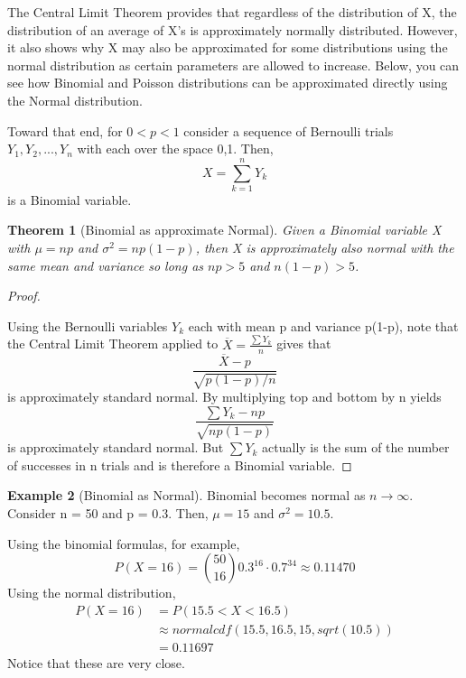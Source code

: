 \documentclass[10pt,]{book}
\theoremstyle{plain}
\newtheorem{theorem}{Theorem}[section]
\theoremstyle{definition}
\theoremstyle{definition}
\newtheorem{example}[theorem]{Example}
\theoremstyle{definition}
\numberwithin{equation}{section}
\newcommand{\lt}{ < }
\newcommand{\gt}{ > }
\begin{document}
The Central Limit Theorem provides that regardless of the distribution of X, the distribution of an average of X's is approximately normally distributed. However, it also shows why X may also be approximated for some distributions using the normal distribution as certain parameters are allowed to increase. Below, you can see how Binomial and Poisson distributions can be approximated directly using the Normal distribution.
%
\par
Toward that end, for \(0 \lt p \lt 1\) consider a sequence of Bernoulli trials \(Y_1, Y_2, ..., Y_n\) with each over the space {0,1}. Then, 
\begin{equation*}X = \sum_{k=1}^n Y_k\end{equation*}
is a Binomial variable.
%
\begin{theorem}[{Binomial as approximate Normal}]\label{theorem-64}
Given a Binomial variable X with \(\mu = np\) and \(\sigma^2 = np(1-p)\), then X is approximately also normal with the same mean and variance so long as \(np \gt 5\) and \(n(1-p) \gt 5\).
\end{theorem}
\begin{proof}\hypertarget{proof-59}{}

Using the Bernoulli variables \(Y_k\) each with mean p and variance p(1-p), note that the Central Limit Theorem applied to \(\overline{X} = \frac{\sum Y_k}{n}\) gives that
\begin{equation*}\frac{\overline{X}-p}{\sqrt{p(1-p)/n}}\end{equation*}
is approximately standard normal. By multiplying top and bottom by n yields
\begin{equation*}\frac{\sum Y_k - np}{\sqrt{np(1-p)}}\end{equation*}
is approximately standard normal. But \(\sum Y_k\) actually is the sum of the number of successes in n trials and is therefore a Binomial variable.
%
\end{proof}
\begin{example}[Binomial as Normal]\label{example-23}
Binomial becomes normal as \( n \rightarrow \infty\).  Consider n = 50 and p = 0.3.  Then, \(\mu = 15\) and \(\sigma^2 = 10.5\).   
%
\par
Using the binomial formulas, for example,
\begin{equation*}P( X = 16 ) = \binom{50}{16} 0.3^{16} \cdot 0.7^{34} \approx 0.11470\end{equation*}
Using the normal distribution,
\begin{align*}
P( X = 16 ) & = P( 15.5 \lt X \lt 16.5) \\
 & \approx normalcdf(15.5,16.5,15,sqrt(10.5)) \\
 & = 0.11697
\end{align*}
Notice that these are very close.
%
\end{example}
\end{document}
